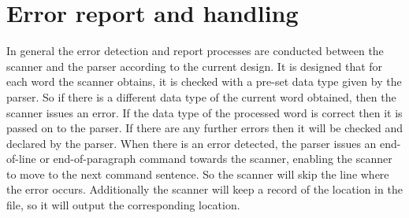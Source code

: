 \documentclass[12pt]{article}
\begin{document}
\newpage
\section{Error report and handling}
In general the error detection and report processes are conducted between the scanner and the parser according to the current design. It is designed that for each word the scanner obtains, 
it is checked with a pre-set data type given by the parser. So if there is a different data type of the current word obtained, then the scanner issues an error. If the data type of 
the processed word is correct then it is passed on to the parser. If there are any further errors then it will be checked and declared by the parser.
When there is an error detected, the parser issues an end-of-line or end-of-paragraph command towards the scanner, enabling the scanner to move to the next command sentence. So the 
scanner will skip the line where the error occurs. Additionally the scanner will keep a record of the location in the file, so it will output the corresponding location.
\end{document}
